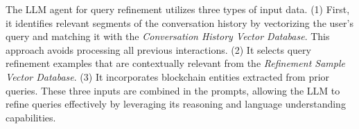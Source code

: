 \documentclass[runningheads]{llncs}
\begin{document}
The LLM agent for query refinement utilizes three types of input data. (1) First, it identifies relevant segments of the conversation history by vectorizing the user's query and matching it with the \textit{Conversation History Vector Database}. This approach avoids processing all previous interactions. (2) It selects query refinement examples that are contextually relevant from the \textit{Refinement Sample Vector Database}. (3) It incorporates blockchain entities extracted from prior queries. These three inputs are combined in the prompts, allowing the LLM to refine queries effectively by leveraging its reasoning and language understanding capabilities.


\end{document}
